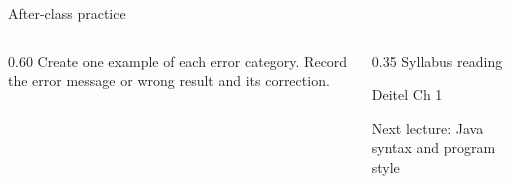 \documentclass[10pt,aspectratio=169]{beamer}
\begin{document}
\begin{frame}[fragile,t]{After-class practice}
\begin{columns}[T,onlytextwidth]\begin{column}{0.60\textwidth}
Create one example of each error category. Record the error message or wrong result and its correction.
\end{column}\begin{column}{0.35\textwidth}\small
Syllabus reading\par Deitel Ch 1

Next lecture: Java syntax and program style
\end{column}\end{columns}
\end{frame}
\end{document}
